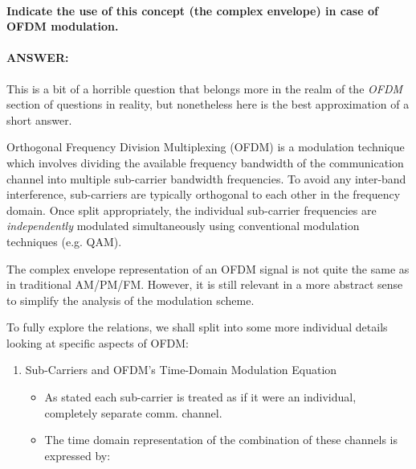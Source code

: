 \documentclass[colorlinks,11pt,a4paper,normalphoto,withhyper,ragged2e]{altareport}
\begin{document}
				\pagebreak
				
				
				
				\paragraph{Indicate the use of this concept (the complex envelope) in case of OFDM modulation.}
				
				\paragraph{ANSWER:}
				
				This is a bit of a horrible question that belongs more in the realm of the \textit{OFDM} section of questions in reality, but nonetheless here is the best approximation of a short answer. \linebreak \vspace{0.4cm}
				
				
				
				Orthogonal Frequency Division Multiplexing (OFDM) is a modulation technique which involves dividing the available frequency bandwidth of the communication channel into multiple sub-carrier bandwidth frequencies. \linebreak To avoid any inter-band interference, sub-carriers are typically orthogonal to each other in the frequency domain. \linebreak Once split appropriately, the individual sub-carrier frequencies are \textit{independently} modulated simultaneously using conventional modulation techniques (e.g. QAM). \linebreak
				
				The complex envelope representation of an OFDM signal is not quite the same as in traditional AM/PM/FM. However, it is still relevant in a more abstract sense to simplify the analysis of the modulation scheme. \linebreak
				
				To fully explore the relations, we shall split into some more individual details looking at specific aspects of OFDM: \linebreak
				
				\begin{enumerate}
					\item Sub-Carriers and OFDM's Time-Domain Modulation Equation
					\begin{itemize}[leftmargin=1cm]
						\item As stated each sub-carrier is treated as if it were an individual, completely separate comm. channel.
						\item The time domain representation of the combination of these channels is expressed by: 
					\end{itemize}
				\end{enumerate}
				
\end{document}
